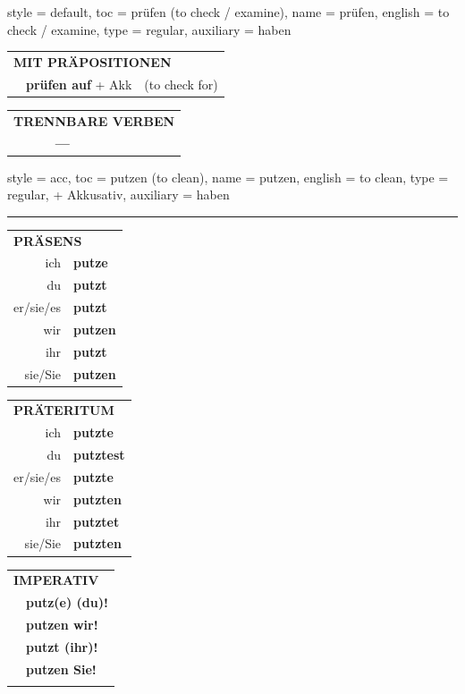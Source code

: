 \begin{verbentry}{
  style = {default},
  toc = {prüfen (to check / examine)},
  name = {prüfen},
  english = {to check / examine},
  type = {regular},
  auxiliary = {haben}
}
\vspace{10pt}

\begin{tabular}{lll}
\multicolumn{3}{l}{\textbf{MIT PRÄPOSITIONEN}}\\
& \textbf{prüfen auf} + Akk & (to check for)\\
\end{tabular}
\hfill
\begin{tabular}{lll}
\multicolumn{3}{l}{\textbf{TRENNBARE VERBEN}}\\
& \textbf{---} & \\
\end{tabular}
\vspace{-5pt}
\end{verbentry}

\begin{verbentry}{
  style = {acc},
  toc = {putzen (to clean)},
  name = {putzen},
  english = {to clean},
  type = {regular, + Akkusativ},
  auxiliary = {haben}
}
 
    
     \vspace{5pt}

    \hrule
    
    \vspace{5pt}

  \begin{tabular}{rl}
     \multicolumn{2}{l}{\textbf{PRÄSENS} }\\
    ich & \textbf{putze}\\
    du & \textbf{putzt}\\
    er/sie/es & \textbf{putzt}\\
    wir & \textbf{putzen}\\
    ihr & \textbf{putzt}\\
    sie/Sie & \textbf{putzen}\\
  \end{tabular}
  \hfill
     \begin{tabular}{rl}
    \multicolumn{2}{l}{\textbf{PRÄTERITUM} }\\
    ich & \textbf{putzte}\\
    du & \textbf{putztest}\\
    er/sie/es & \textbf{putzte}\\
    wir & \textbf{putzten}\\
    ihr & \textbf{putztet}\\
    sie/Sie & \textbf{putzten}\\
  \end{tabular}
  \hfill
  \begin{tabular}{rl}
     \multicolumn{2}{l}{\textbf{IMPERATIV} }\\
   & \textbf{putz(e) (du)!}\\
   & \textbf{putzen wir!}\\
   & \textbf{putzt (ihr)!}\\
   & \textbf{putzen Sie!}\\
   & \vspace{10pt}
  \end{tabular}


\end{verbentry}
